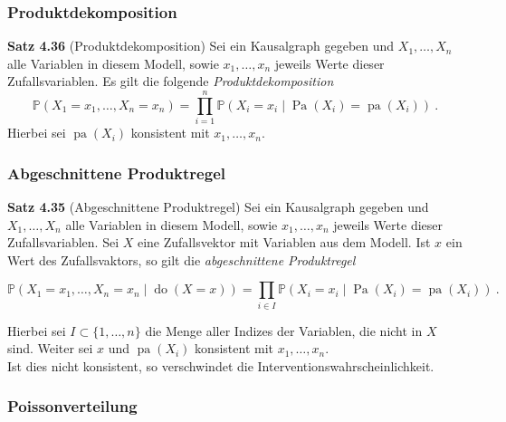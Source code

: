 \documentclass{beamer}
\newcommand{\Do}{\operatorname{do}}
\newcommand{\Pa}{\operatorname{Pa}}
\newcommand{\pa}{\operatorname{pa}}
\newcommand{\klein}[1]{{\scriptsize #1}}
\begin{document}
\begin{frame}
\frametitle{Produktdekomposition}

\begin{block}{\textbf{Satz 4.36} \klein{(Produktdekomposition)}}
Sei ein Kausalgraph gegeben und $X_1, \dots, X_n$ alle Variablen in diesem Modell, sowie $x_1, \dots, x_n$ jeweils Werte dieser Zufallsvariablen. Es gilt die folgende \textit{Produktdekomposition}
\[\mathbb{P}(X_1 = x_1, \dots, X_n = x_n) = \prod_{i=1}^n \mathbb{P}(X_i = x_i \mid \Pa(X_i) = \pa(X_i))~.\]
Hierbei sei $\pa(X_i)$ konsistent mit $x_1, \dots, x_n$.
\end{block}
\end{frame}

\begin{frame}
\frametitle{Abgeschnittene Produktregel}

\begin{block}{\textbf{Satz 4.35} \klein{(Abgeschnittene Produktregel)}}
Sei ein Kausalgraph gegeben und $X_1, \dots, X_n$ alle Variablen in diesem Modell, sowie $x_1, \dots, x_n$ jeweils Werte dieser Zufallsvariablen. Sei $X$ eine Zufallsvektor mit Variablen aus dem Modell. Ist $x$ ein Wert des Zufallsvaktors, so gilt die \textit{abgeschnittene Produktregel}
\begin{scriptsize}
\[\mathbb{P}(X_1 = x_1, \dots, X_n = x_n \mid \Do(X = x)) = \prod_{i \in I} \mathbb{P}(X_i = x_i \mid \Pa(X_i) = \pa(X_i))~.\]
\end{scriptsize}
Hierbei sei $I \subset \{1, \dots, n\}$ die Menge aller Indizes der Variablen, die nicht in $X$ sind. Weiter sei $x$ und $\pa(X_i)$ konsistent mit $x_1, \dots, x_n$.\\
Ist dies nicht konsistent, so verschwindet die Interventionswahrscheinlichkeit.
\end{block}
\end{frame}

\begin{frame}
\frametitle{Poissonverteilung}

\begin{center}
\end{center}
\end{frame}
\end{document}

